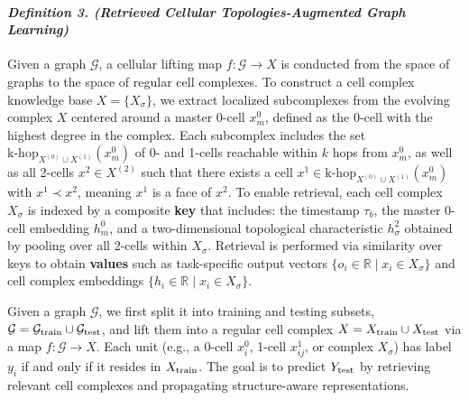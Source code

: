 \paragraph{\textit{Definition 3. (Retrieved Cellular Topologies-Augmented Graph Learning)}}  
Given a graph $\mathcal{G}$, a cellular lifting map  $f: \mathcal{G} \to X$ is conducted from the space of graphs to the space of regular cell complexes. 
To construct a cell complex knowledge base \(X = \{X_\sigma\}\), we extract localized subcomplexes from the evolving complex \(X\) centered around a master 0-cell \( x_m^0 \), defined as the 0-cell with the highest degree in the complex. Each subcomplex includes the set \(\mathrm{k\text{-}hop}_{X^{(0)} \cup X^{(1)}}(x_m^0)\) of 0- and 1-cells reachable within \(k\) hops from \(x_m^0\), as well as all 2-cells \(x^2 \in X^{(2)}\) such that there exists a cell \(x^1 \in \mathrm{k\text{-}hop}_{X^{(0)} \cup X^{(1)}}(x_m^0)\) with \(x^1 \prec x^2\), meaning \(x^1\) is a face of \(x^2\). To enable retrieval, each cell complex $X_\sigma$ is indexed by a composite \textbf{key} that includes: the timestamp $\tau_b$, the master 0-cell embedding $h_{m}^0$,  and a two-dimensional topological characteristic $h_{\sigma}^2$ obtained by pooling over all 2-cells within $X_\sigma$. Retrieval is performed via similarity over keys to obtain \textbf{values} such as task-specific output vectors $\{o_i \in \mathbb{R} \mid x_i \in X_\sigma\}$ and cell complex embeddings $\{h_i \in \mathbb{R} \mid x_i \in  X_\sigma\}$. 

Given a  graph $\mathcal{G}$, we first split it into training and testing subsets, $\mathcal{G} = \mathcal{G}_{\rm{train}} \cup \mathcal{G}_{\rm{test}}$, and lift them into a regular cell complex $X = X_{\rm{train}} \cup X_{\rm{test}}$ via a map $f: \mathcal{G} \rightarrow X$. Each unit (e.g., a 0-cell $x^0_i$, 1-cell $x^1_{ij}$, or complex $X_\sigma$) has label $y_i$ if and only if it resides in $X_{\rm{train}}$. The goal is to predict $Y_{\rm{test}}$ by retrieving relevant cell complexes and propagating structure-aware representations. %
